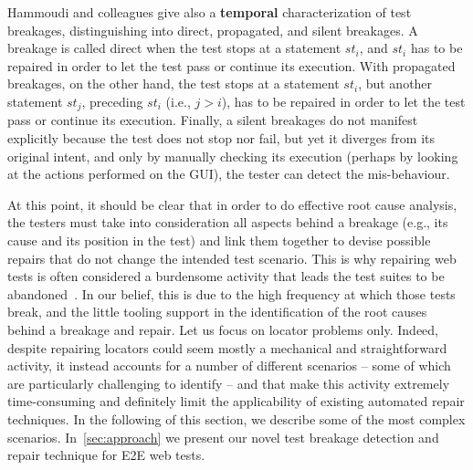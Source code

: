Hammoudi and colleagues give also a \textbf{temporal} characterization of test breakages, distinguishing into direct, propagated, and silent breakages. A breakage is called direct when the test stops at a statement $st_i$, and $st_i$ has to be repaired in order to let the test pass or continue its execution. With propagated breakages, on the other hand, the test stops at a statement $st_i$, but another statement $st_j$, preceding $st_i$ (i.e., $j > i$), has to be repaired in order to let the test pass or continue its execution. Finally, a silent breakages do not manifest explicitly because the test does not stop nor fail, but yet it diverges from its original intent, and only by manually checking its execution (perhaps by looking at the actions performed on the GUI), the tester can detect the mis-behaviour.

At this point, it should be clear that in order to do effective root cause analysis, the testers must take into consideration all aspects behind a breakage (e.g., its cause and its position in the test) and link them together to devise possible repairs that do not change the intended test scenario. This is why repairing web tests is often considered a burdensome activity that leads the test suites to be abandoned~\cite{Christophe2014}. In our belief, this is due to the high frequency at which those tests break, and the little tooling support in the identification of the root causes behind a breakage and repair.
%
Let us focus on locator problems only. Indeed, despite repairing locators could seem mostly a mechanical and straightforward activity, it instead accounts for a number of different scenarios -- some of which are particularly challenging to identify -- and that make this activity extremely time-consuming and 
definitely limit the applicability of existing automated repair techniques. In the following of this section, we describe some of the most complex scenarios. In~\autoref{sec:approach} we present our novel test breakage detection and repair technique for E2E web tests.


